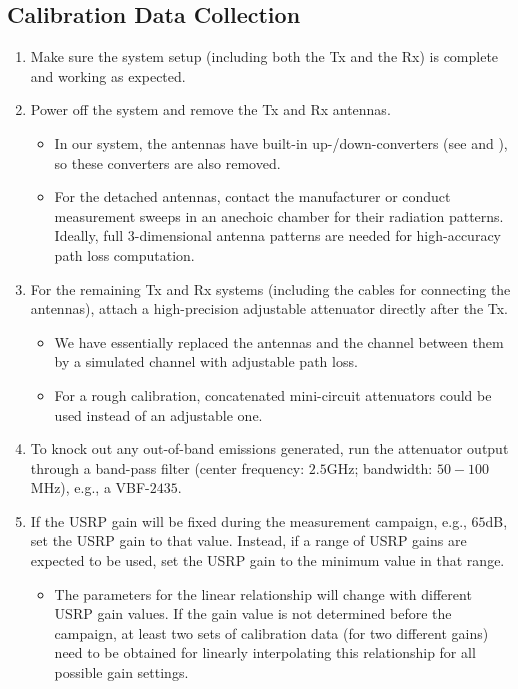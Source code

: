 \documentclass[12pt, draftcls, onecolumn]{IEEEtran}
\begin{document}
\subsection{Calibration Data Collection}
\begin{enumerate}
    \item Make sure the system setup (including both the Tx and the Rx) is complete and working as expected.
    \item Power off the system and remove the Tx and Rx antennas. 
        \begin{itemize} 
            \item In our system, the antennas have built-in up-/down-converters (see  and ), so these converters are also removed. 
            \item For the detached antennas, contact the manufacturer or conduct measurement sweeps in an anechoic chamber for their radiation patterns. Ideally, full $3$-dimensional antenna patterns are needed for high-accuracy path loss computation.
        \end{itemize}
    \item For the remaining Tx and Rx systems (including the cables for connecting the antennas), attach a high-precision adjustable attenuator directly after the Tx.  
        \begin{itemize}
            \item We have essentially replaced the antennas and the channel between them by a simulated channel with adjustable path loss.
            \item For a rough calibration, concatenated mini-circuit attenuators could be used instead of an adjustable one.
        \end{itemize} 
    \item To knock out any out-of-band emissions generated, run the attenuator output through a band-pass filter (center frequency: $2.5$GHz; bandwidth: $50{-}100$MHz), e.g., a VBF-$2435$.
    \item If the USRP gain will be fixed during the measurement campaign, e.g., $65$dB, set the USRP gain to that value. Instead, if a range of USRP gains are expected to be used, set the USRP gain to the minimum value in that range.
        \begin{itemize}
            \item The parameters for the linear relationship will change with different USRP gain values. If the gain value is not determined before the campaign, at least two sets of calibration data (for two different gains) need to be obtained for linearly interpolating this relationship for all possible gain settings.  

\end{itemize}
\end{enumerate}
\end{document}
